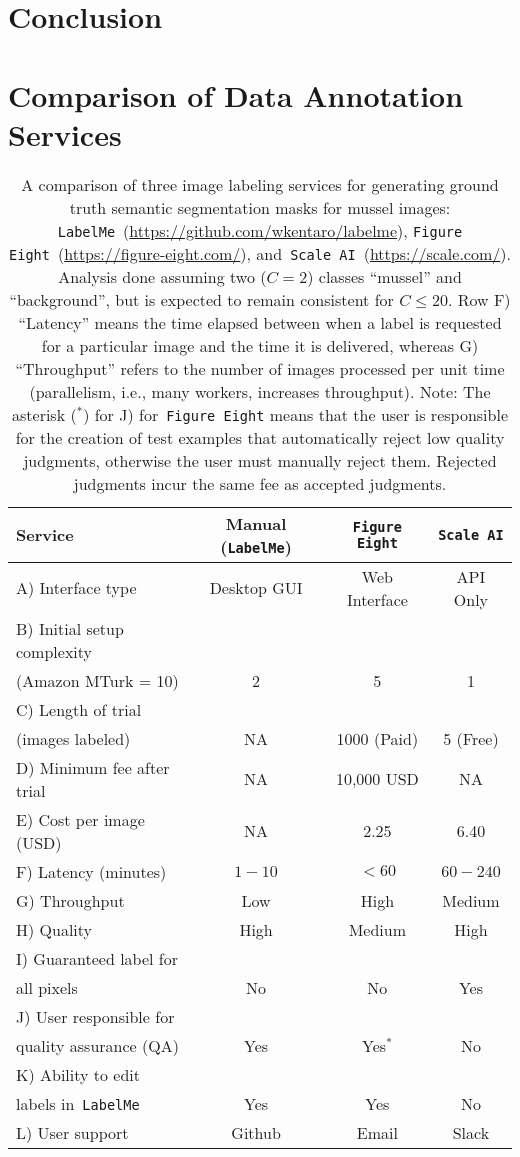\documentclass[11pt]{article} %
\begin{document}
\section{Conclusion}

\section{Comparison of Data Annotation Services}

\begin{table}[]
\caption{A comparison of three image labeling services for generating ground
truth semantic segmentation masks for mussel images:
\texttt{LabelMe}~(\url{https://github.com/wkentaro/labelme}),
\texttt{Figure Eight}~(\url{https://figure-eight.com/}),
and~\texttt{Scale AI}~(\url{https://scale.com/}).
Analysis done assuming two ($C=2$) classes ``mussel'' and ``background'', but
is expected to remain consistent for $C \leq 20$. Row F) ``Latency'' means the
time elapsed between when a label is requested for a particular image and the
time it is delivered, whereas G) ``Throughput'' refers to the number of images
processed per unit time (parallelism, i.e., many workers, increases
throughput). Note: The asterisk ($^*$) for J) for~\texttt{Figure Eight} means
that the user is responsible for the creation of test examples that
automatically reject low quality judgments, otherwise the user must manually
reject them. Rejected judgments incur the same fee as accepted judgments.}
\begin{tabular}{lccc}
\toprule
Service & Manual (\texttt{LabelMe}) & \texttt{Figure Eight} & \texttt{Scale AI} 
\\ \midrule
A) Interface type & Desktop GUI & Web Interface & API Only \\ \midrule
B) Initial setup complexity \\ (Amazon MTurk = 10) & 2 & 5 & 1 \\ \midrule
C) Length of trial \\ (images labeled) & NA & 1000 (Paid) & 5 (Free) \\ \midrule
D) Minimum fee after trial & NA & 10,000 USD & NA \\ \midrule
E) Cost per image (USD) & NA & 2.25 & 6.40 \\ \midrule
F) Latency (minutes) & $1-10$ & $< 60$ & $60-240$ \\ \midrule
G) Throughput & Low & High & Medium \\ \midrule
H) Quality & High & Medium & High \\ \midrule
I) Guaranteed label for \\ all pixels & No & No & Yes \\ \midrule
J) User responsible for \\ quality assurance (QA) & Yes & Yes$^*$ & No \\  
\midrule
K) Ability to edit \\ labels in~\texttt{LabelMe} & Yes & Yes & No \\ \midrule
L) User support & Github & Email & Slack \\ 
\bottomrule
\end{tabular}
\end{table}
\end{document}
